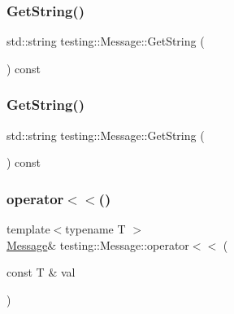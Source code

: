 \mbox{\label{classtesting_1_1_message_a2cdc4df62bdcc9df37651a1cf527704e}} 
\subsubsection{\texorpdfstring{GetString()}{GetString()}\hspace{0.1cm}{\footnotesize\ttfamily [2/3]}}
{\footnotesize\ttfamily std\+::string testing\+::\+Message\+::\+Get\+String (\begin{DoxyParamCaption}{ }\end{DoxyParamCaption}) const}

\mbox{\label{classtesting_1_1_message_a2cdc4df62bdcc9df37651a1cf527704e}} 
\subsubsection{\texorpdfstring{GetString()}{GetString()}\hspace{0.1cm}{\footnotesize\ttfamily [3/3]}}
{\footnotesize\ttfamily std\+::string testing\+::\+Message\+::\+Get\+String (\begin{DoxyParamCaption}{ }\end{DoxyParamCaption}) const}

\mbox{\label{classtesting_1_1_message_a2e0e71be52d54c20a75a55fca812721f}} 
\subsubsection{\texorpdfstring{operator$<$$<$()}{operator<<()}\hspace{0.1cm}{\footnotesize\ttfamily [1/18]}}
{\footnotesize\ttfamily template$<$typename T $>$ \\
\mbox{\hyperlink{classtesting_1_1_message}{Message}}\& testing\+::\+Message\+::operator$<$$<$ (\begin{DoxyParamCaption}\item[{const T \&}]{val }\end{DoxyParamCaption})\hspace{0.3cm}{\ttfamily [inline]}}

